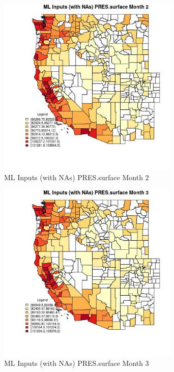 \begin{figure} 
\centering  
\includegraphics[width=0.77\textwidth]{Code_Outputs/Report_ML_input_PM25_Step4_part_f_de_duplicated_aves_prioritize_24hr_obswNAs_CountyPRESsurfacemedianMonth2.jpg} 
\caption{\label{fig:Report_ML_input_PM25_Step4_part_f_de_duplicated_aves_prioritize_24hr_obswNAsCountyPRESsurfacemedianMonth2}ML Inputs (with NAs) PRES.surface Month 2} 
\end{figure} 
 

\begin{figure} 
\centering  
\includegraphics[width=0.77\textwidth]{Code_Outputs/Report_ML_input_PM25_Step4_part_f_de_duplicated_aves_prioritize_24hr_obswNAs_CountyPRESsurfacemedianMonth3.jpg} 
\caption{\label{fig:Report_ML_input_PM25_Step4_part_f_de_duplicated_aves_prioritize_24hr_obswNAsCountyPRESsurfacemedianMonth3}ML Inputs (with NAs) PRES.surface Month 3} 
\end{figure} 
 

